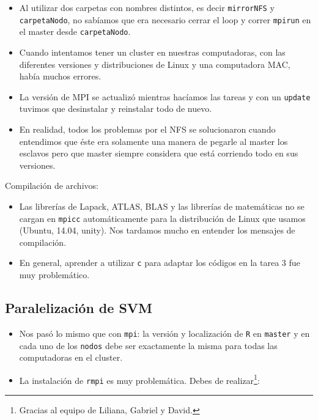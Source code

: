 \documentclass[]{article}
\let\rmarkdownfootnote\footnote%
\def\footnote{\protect\rmarkdownfootnote}
\begin{document}
\begin{itemize}
\itemsep1pt\parskip0pt
\item
  Al utilizar dos carpetas con nombres distintos, es decir
  \texttt{mirrorNFS} y \texttt{carpetaNodo}, no sabíamos que era
  necesario cerrar el loop y correr \texttt{mpirun} en el master desde
  \texttt{carpetaNodo}.
\item
  Cuando intentamos tener un cluster en nuestras computadoras, con las
  diferentes versiones y distribuciones de Linux y una computadora MAC,
  había muchos errores.
\item
  La versión de MPI se actualizó mientras hacíamos las tareas y con un
  \texttt{update} tuvimos que desinstalar y reinstalar todo de nuevo.
\item
  En realidad, todos los problemas por el NFS se solucionaron cuando
  entendimos que éste era solamente una manera de pegarle al master los
  esclavos pero que master siempre considera que está corriendo todo en
  sus versiones.
\end{itemize}

Compilación de archivos:

\begin{itemize}
\itemsep1pt\parskip0pt
\item
  Las librerías de Lapack, ATLAS, BLAS y las librerías de matemáticas no
  se cargan en \texttt{mpicc} automáticamente para la distribución de
  Linux que usamos (Ubuntu, 14.04, unity). Nos tardamos mucho en
  entender los mensajes de compilación.
\item
  En general, aprender a utilizar \texttt{c} para adaptar los códigos en
  la tarea 3 fue muy problemático.
\end{itemize}

\subsection{Paralelización de SVM}\label{paralelizacion-de-svm}

\begin{itemize}
\itemsep1pt\parskip0pt
\item
  Nos pasó lo mismo que con \texttt{mpi}: la versión y localización de
  \texttt{R} en \texttt{master} y en cada uno de los \texttt{nodos} debe
  ser exactamente la misma para todas las computadoras en el cluster.
\item
  La instalación de \texttt{rmpi} es muy problemática. Debes de
  realizar\footnote{Gracias al equipo de Liliana, Gabriel y David.}:
\end{itemize}
\end{document}
